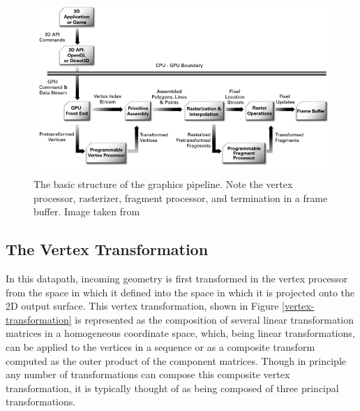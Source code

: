 \begin{figure}[ht!]
\centering
\includegraphics[width=1.0\textwidth]{images/graphics-pipeline.png}
\caption{The basic structure of the graphics pipeline. Note the vertex processor, rasterizer, fragment processor, and termination in a frame buffer. Image taken from  \protect\cite{pipeline-image-ref}}
\label{graphics-pipeline}
\end{figure}


\subsection{The Vertex Transformation}
In this datapath, incoming geometry is first transformed in the vertex processor from the space in which it defined into the space in which it is projected onto the 2D output surface. This vertex transformation, shown in Figure \ref{vertex-transformation} is represented as the composition of several linear transformation matrices in a homogeneous coordinate space, which, being linear transformations, can be applied to the vertices in a sequence or as a composite transform computed as the outer product of the component matrices. Though in principle any number of transformations can compose this composite vertex transformation, it is typically thought of as being composed of three principal transformations. 

